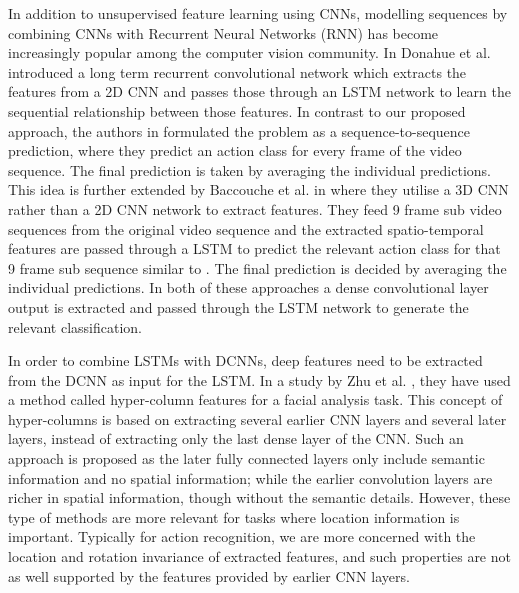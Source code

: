 \documentclass[10pt,twocolumn,letterpaper]{article}
\begin{document}
	
		 In addition to unsupervised feature learning using CNNs, modelling sequences by combining CNNs with Recurrent Neural Networks (RNN) has become increasingly popular among the computer vision community. In \cite{Jeff2015} Donahue et al. introduced a long term recurrent convolutional network which extracts the features from a 2D CNN and passes those through an LSTM network to learn the sequential relationship between those features. In contrast to our proposed approach, the authors in \cite{Jeff2015} formulated the problem as a sequence-to-sequence prediction, where they predict an action class for every frame of the video sequence. The final prediction is taken by averaging the individual predictions. This idea is further extended by Baccouche et al. in \cite{Baccouche2011} where they utilise a 3D CNN rather than a 2D CNN network to extract features. They feed 9 frame sub video sequences from the original video sequence and the extracted spatio-temporal features are passed through a LSTM to predict the relevant action class for that 9 frame sub sequence similar to \cite{Jeff2015}. The final prediction is decided by averaging the individual predictions. In both of these approaches a dense convolutional layer output is extracted and passed through the LSTM network to generate the relevant classification.  
		      
		 
		 In order to combine LSTMs with DCNNs, deep features need to be extracted from the DCNN as input for the LSTM. In a study by Zhu et al. \cite{Zhu2016}, they have used a method called hyper-column features for a facial analysis task. This concept of hyper-columns is based on extracting several earlier CNN layers and several later layers, instead of extracting only the last dense layer of the CNN. Such an approach is proposed as the later fully connected layers only include semantic information and no spatial information; while the earlier convolution layers are richer in spatial information, though without the semantic details. However, these type of methods are more relevant for tasks where location information is important. Typically for action recognition, we are more concerned with the location and rotation invariance of extracted features, and such properties are not as well supported by the features provided by earlier CNN layers.
\end{document}
